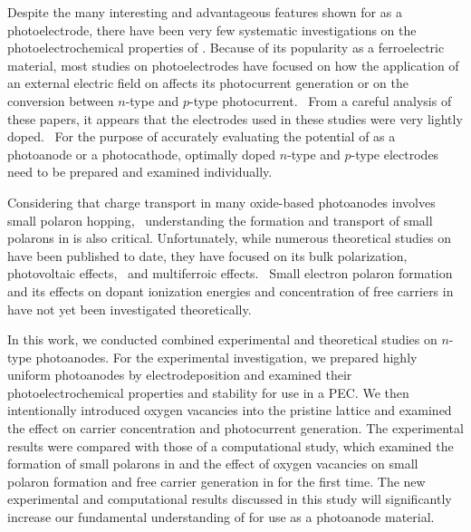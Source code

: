 Despite the many interesting and advantageous features shown for  as a photoelectrode, there have been very few systematic investigations on the photoelectrochemical properties of . Because of its popularity as a ferroelectric material, most studies on  photoelectrodes have focused on how the application of an external electric field on  affects its photocurrent generation or on the conversion between $n$-type and $p$-type photocurrent.~\cite{song2018domain,liu2016enhanced,cao2014switchable,huang2016tunable} From a careful analysis of these papers, it appears that the  electrodes used in these studies were very lightly doped.~\cite{lee2019progress} For the purpose of accurately evaluating the potential of  as a photoanode or a photocathode, optimally doped $n$-type and $p$-type  electrodes need to be prepared and examined individually.

Considering that charge transport in many oxide-based photoanodes involves small polaron hopping,~\cite{wheeler2019combined,smart2019optical,smart2018mechanistic,smart2017effect,seo2018role,kim2015simultaneous} understanding the formation and transport of small polarons in  is also critical. Unfortunately, while numerous theoretical studies on  have been published to date, they have focused on its bulk polarization,~\cite{kan2011chemical,neaton2005first} photovoltaic effects,~\cite{young2012first,liu2013development} and multiferroic effects.~\cite{wang2012atomistic,chang2016prediction} Small electron polaron formation and its effects on dopant ionization energies and concentration of free carriers in  have not yet been investigated theoretically.

In this work, we conducted combined experimental and theoretical studies on $n$-type  photoanodes. For the experimental investigation, we prepared highly uniform  photoanodes by electrodeposition and examined their photoelectrochemical properties and stability for use in a PEC. We then intentionally introduced oxygen vacancies into the pristine  lattice and examined the effect on carrier concentration and photocurrent generation. The experimental results were compared with those of a computational study, which examined the formation of small polarons in  and the effect of oxygen vacancies on small polaron formation and free carrier generation in  for the first time. The new experimental and computational results discussed in this study will significantly increase our fundamental understanding of  for use as a photoanode material.

